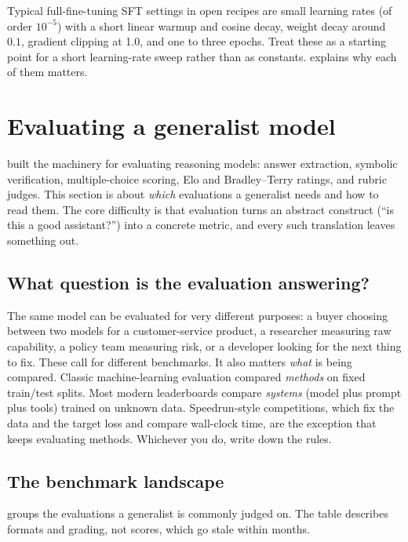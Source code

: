 Typical full-fine-tuning SFT settings in open recipes are small learning rates (of order
$10^{-5}$) with a short linear warmup and cosine decay, weight decay around $0.1$, gradient
clipping at 1.0, and one to three epochs. Treat these as a starting point for a short learning-rate
sweep rather than as constants.  explains why each of them matters.

\section{Evaluating a generalist model}\label{sec:align:evalfamilies}


 built the machinery for evaluating reasoning models: answer extraction,
symbolic verification, multiple-choice scoring, Elo and Bradley--Terry ratings, and rubric
judges. This section is about \emph{which} evaluations a generalist needs and how to read
them. The core difficulty is that evaluation turns an abstract construct (``is this a good
assistant?'') into a concrete metric, and every such translation leaves something out.

\subsection{What question is the evaluation answering?}

The same model can be evaluated for very different purposes: a buyer choosing between two
models for a customer-service product, a researcher measuring raw capability, a policy team
measuring risk, or a developer looking for the next thing to fix. These call for different
benchmarks. It also matters \emph{what} is being compared. Classic machine-learning evaluation
compared \emph{methods} on fixed train/test splits. Most modern leaderboards compare
\emph{systems} (model plus prompt plus tools) trained on unknown data. Speedrun-style
competitions, which fix the data and the target loss and compare wall-clock time, are the
exception that keeps evaluating methods. Whichever you do, write down the rules.

\subsection{The benchmark landscape}

 groups the evaluations a generalist is commonly judged on. The table
describes formats and grading, not scores, which go stale within months.

